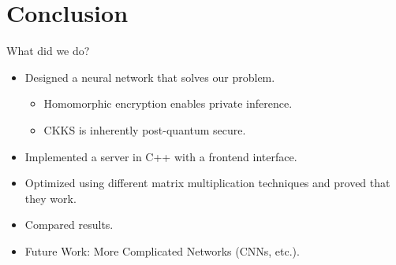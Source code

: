 \section{Conclusion}
\begin{frame}{What did we do?}
  \begin{itemize}
    \item Designed a neural network that solves our problem.
          \begin{itemize}
            \item Homomorphic encryption enables private inference.
            \item CKKS is inherently post-quantum secure.
          \end{itemize}
    \item Implemented a server in C++ with a frontend interface.
    \item Optimized using different matrix multiplication techniques and proved that they work.
    \item Compared results.
    \item Future Work: More Complicated Networks (CNNs, etc.).
  \end{itemize}
\end{frame}
